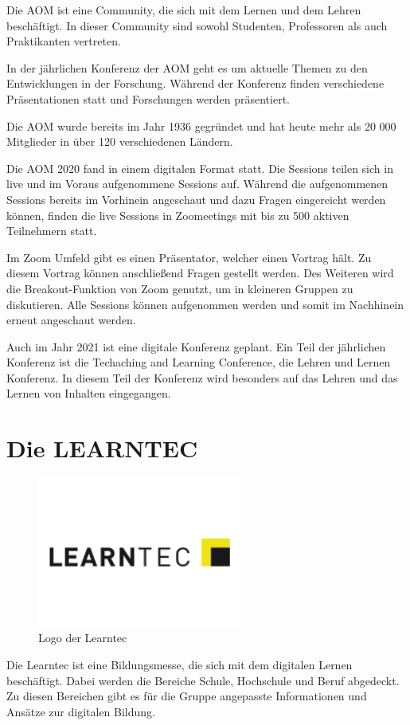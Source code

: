 Die \ac{AOM} ist eine Community, die sich mit dem Lernen und dem Lehren beschäftigt. In dieser Community sind sowohl Studenten, Professoren als auch Praktikanten vertreten. \autocite[Vgl.][]{AOM_CMS.432021d}

In der jährlichen Konferenz der \ac{AOM} geht es um aktuelle Themen zu den Entwicklungen in der Forschung. Während der Konferenz finden verschiedene Präsentationen statt und Forschungen werden präsentiert. \autocite[Vgl.][]{AOM_CMS.432021b} 

Die \ac{AOM} wurde bereits im Jahr 1936 gegründet und hat heute mehr als 20 000 Mitglieder in über 120 verschiedenen Ländern. \autocite[Vgl.][]{AOM_CMS.432021b} 

Die \ac{AOM} 2020 fand in einem digitalen Format statt. Die Sessions teilen sich in live und im Voraus aufgenommene Sessions auf. Während die aufgenommenen Sessions bereits im Vorhinein angeschaut und dazu Fragen eingereicht werden können, finden die live Sessions in Zoomeetings mit bis zu 500 aktiven Teilnehmern statt. \autocite[Vgl.][]{AOM_CMS.432021} 

Im Zoom Umfeld gibt es einen Präsentator, welcher einen Vortrag hält. Zu diesem Vortrag können anschließend Fragen gestellt werden. Des Weiteren wird die Breakout-Funktion von Zoom genutzt, um in kleineren Gruppen zu diskutieren. Alle Sessions können aufgenommen werden und somit im Nachhinein erneut angeschaut werden. \autocite[Vgl.][]{AOM_CMS.432021c} 

Auch im Jahr 2021 ist eine digitale Konferenz geplant. \autocite[Vgl.][]{AOM_CMS.432021d}  Ein Teil der jährlichen Konferenz ist die Techaching and Learning Conference, die Lehren und Lernen Konferenz. In diesem Teil der Konferenz wird besonders auf das Lehren und das Lernen von Inhalten eingegangen.


\section{Die LEARNTEC}
\begin{figure}[h]
    \centering
    \includegraphics[width=0.6\textwidth]{img/logolearn.png}
    \caption[Logo: Learntec]{Logo der Learntec}
    \label{fig: LOGO LEARNTEC}
\end{figure}
Die Learntec ist eine Bildungsmesse, die sich mit dem digitalen Lernen beschäftigt. Dabei werden die Bereiche Schule, Hochschule und Beruf abgedeckt. Zu diesen Bereichen gibt es für die Gruppe angepasste Informationen und Ansätze zur digitalen Bildung. \autocite[Vgl.][]{KarlsruherMesseundKongressGmbH.3232021} 

